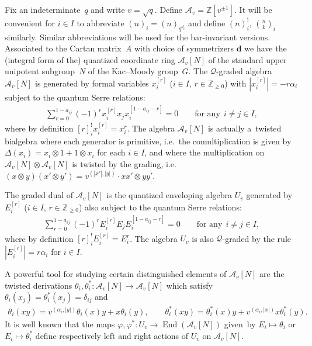 \documentclass[pdftex]{sigma}
\numberwithin{equation}{section}
\begin{document}
Fix an indeterminate~$q$ and write $v=\sqrt{q}$.
Def\/ine $\mathcal{A}_v=\mathbb{Z}[v^{\pm1}]$.
It will be convenient for $i\in I$ to abbreviate $(n)_i=(n)_{q^{d_i}}$ and def\/ine $(n)^!_i$, ${n\choose k}_i$ similarly.
Similar abbreviations will be used for the bar-invariant versions.
Associated to the Cartan matrix~$A$ with choice of symmetrizers $\mathbf{d}$ we have the (integral form of the)
quantized coordinate ring $\mathcal{A}_v[N]$ of the standard upper unipotent subgroup~$N$ of the Kac--Moody group~$G$.
The $\mathcal{Q}$-graded algebra $\mathcal{A}_v[N]$ is generated by formal variables $x_i^{[r]}$ ($i\in I$,
$r\in\mathbb{Z}_{\ge0}$) with $|x_i^{[r]}|=-r\alpha_i$ subject to the quantum Serre relations:
\begin{gather*}
\sum\limits_{r=0}^{1-a_{ij}} (-1)^r x_i^{[r]}x_jx_i^{[1-a_{ij}-r]}=0
\qquad
\text{for any} \ \ i\ne j\in I,
\end{gather*}
where by def\/inition $[r]_i^!x_i^{[r]}=x_i^r$.
The algebra $\mathcal{A}_v[N]$ is actually a~twisted bialgebra where  %
each generator is primitive, i.e.~the comultiplication is given
by $\Delta(x_i)=x_i\otimes1+1\otimes x_i$ for each $i\in I$, and where the multiplication on  %
$\mathcal{A}_v[N]\otimes\mathcal{A}_v[N]$ is twisted by the grading, i.e.~$(x\otimes y)(x'\otimes y')=v^{(|x'|,|y|)}\cdot xx'\otimes yy'$.

The graded dual of $\mathcal{A}_v[N]$ is the quantized enveloping algebra $U_v$ generated by $E_i^{[r]}$ ($i\in I$,
$r\in\mathbb{Z}_{\ge0}$) also subject to the quantum Serre relations:
\begin{gather*}
\sum\limits_{r=0}^{1-a_{ij}} (-1)^r E_i^{[r]}E_jE_i^{[1-a_{ij}-r]}=0
\qquad
\text{for any} \ \ i\ne j\in I,
\end{gather*}
where by def\/inition $[r]_i^!E_i^{[r]}=E_i^r$.
The algebra $U_v$ is also $\mathcal{Q}$-graded by the rule $|E_i^{[r]}|=r\alpha_i$ for $i\in I$.

A powerful tool for studying certain distinguished elements of $\mathcal{A}_v[N]$ are the twisted derivations
$\theta_i,\theta_i^*:\mathcal{A}_v[N]\to\mathcal{A}_v[N]$ which satisfy $\theta_i(x_j)=\theta^*_i(x_j)=\delta_{ij}$ and
\begin{gather*}
\theta_i(xy)
=v^{(\alpha_i,|y|)}\theta_i(x)y+x\theta_i(y),
\qquad
\theta_i^*(xy) =\theta^*_i(x)y+v^{(\alpha_i,|x|)}x\theta^*_i(y).
\end{gather*}
It is well known that the maps $\varphi,\varphi^*:U_v\to\operatorname{End}(\mathcal{A}_v[N])$ given~by
$E_i\mapsto\theta_i$ or $E_i\mapsto\theta^*_i$ def\/ine respectively left and right actions of $U_v$ on
$\mathcal{A}_v[N]$.
\end{document}
